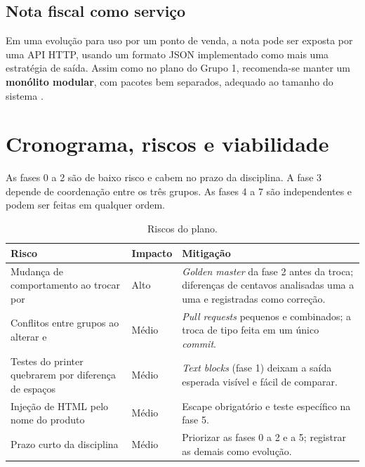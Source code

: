 \subsection{Nota fiscal como servi\c{c}o}
Em uma evolu\c{c}\~ao para uso por um ponto de venda, a nota pode ser exposta por uma API HTTP, usando um formato JSON implementado como mais uma estrat\'egia de sa\'ida. Assim como no plano do Grupo 1, recomenda-se manter um \textbf{mon\'olito modular}, com pacotes bem separados, adequado ao tamanho do sistema \cite{sommerville2019}.

\section{Cronograma, riscos e viabilidade}
As fases 0 a 2 s\~ao de baixo risco e cabem no prazo da disciplina. A fase 3 depende de coordena\c{c}\~ao entre os tr\^es grupos. As fases 4 a 7 s\~ao independentes e podem ser feitas em qualquer ordem.

\begin{table}[H]\centering\small
\begin{tabularx}{\textwidth}{>{\raggedright\arraybackslash}p{4.4cm}>{\raggedright\arraybackslash}p{2cm}Y}
\toprule \textbf{Risco} & \textbf{Impacto} & \textbf{Mitiga\c{c}\~ao} \\ \midrule
Mudan\c{c}a de comportamento ao trocar  por  & Alto & \textit{Golden master} da fase 2 antes da troca; diferen\c{c}as de centavos analisadas uma a uma e registradas como corre\c{c}\~ao. \\
Conflitos entre grupos ao alterar  e  & M\'edio & \textit{Pull requests} pequenos e combinados; a troca de tipo feita em um \'unico \textit{commit}. \\
Testes do printer quebrarem por diferen\c{c}a de espa\c{c}os & M\'edio & \textit{Text blocks} (fase 1) deixam a sa\'ida esperada vis\'ivel e f\'acil de comparar. \\
Inje\c{c}\~ao de HTML pelo nome do produto & M\'edio & Escape obrigat\'orio e teste espec\'ifico na fase 5. \\
Prazo curto da disciplina & M\'edio & Priorizar as fases 0 a 2 e a 5; registrar as demais como evolu\c{c}\~ao. \\
\bottomrule\end{tabularx}
\caption{Riscos do plano.}\end{table}

